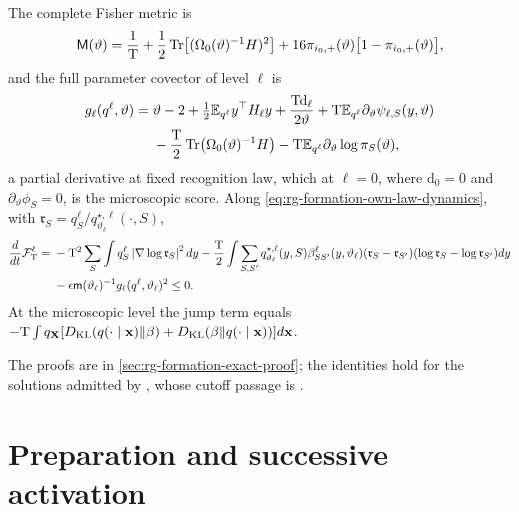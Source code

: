 The complete Fisher metric is
\begin{equation}
\mathsf M(\vartheta)
=\frac1{\mathrm T}+\frac12\operatorname{Tr}\bigl[(\Omega_0(\vartheta)^{-1}H)^2\bigr]
 +16\pi_{i_0,+}(\vartheta)\bigl[1-\pi_{i_0,+}(\vartheta)\bigr],
\label{eq:rg-formation-model-fisher}
\end{equation}
and the full parameter covector of level \(\ell\) is
\begin{equation}
\begin{aligned}
g_\ell(q^\ell,\vartheta)
={}&\vartheta-2+\tfrac12\mathbb E_{q^\ell}y^\top H_\ell y
       +\frac{\mathrm T \mathrm d_\ell}{2\vartheta}
       +\mathrm T\mathbb E_{q^\ell}\partial_\vartheta\psi_{\ell,S}(y,\vartheta)\\
 &-\frac{\mathrm T}2\operatorname{Tr}\bigl(\Omega_0(\vartheta)^{-1}H\bigr)
       -\mathrm T\mathbb E_{q^\ell}\partial_\vartheta\log\pi_S(\vartheta),
\end{aligned}
\label{eq:rg-formation-complete-score}
\end{equation}
a partial derivative at fixed recognition law, which at \(\ell=0\), where
\(\mathrm d_0=0\) and \(\partial_\vartheta\phi_S=0\), is the microscopic score.
Along \cref{eq:rg-formation-own-law-dynamics}, with
\(\mathfrak r_S=q^\ell_S/q^{\star,\ell}_{\vartheta_\ell}(\cdot,S)\),
\begin{equation}
\begin{aligned}
\frac{d}{dt}\mathcal F_{\mathrm T}^\ell
={}&-\mathrm T^2\sum_S\int q_S^\ell
       \left|\nabla\log\mathfrak r_S\right|^2dy
 -\frac{\mathrm T}2\int\sum_{S,S'}q^{\star,\ell}_{\vartheta_\ell}(y,S)\beta^\ell_{SS'}(y,\vartheta_\ell)
       (\mathfrak r_S-\mathfrak r_{S'})(\log\mathfrak r_S-\log\mathfrak r_{S'}) dy\\
 &-\epsilon \mathsf m(\vartheta_\ell)^{-1}g_\ell(q^\ell,\vartheta_\ell)^2
 \le0.
\end{aligned}
\label{eq:rg-formation-dissipation}
\end{equation}
At the microscopic level the jump term equals
\(-\mathrm T\int q_{\mathbf X}[D_{\mathrm{KL}}(q(\cdot\mid\mathbf x)\Vert\beta)
+D_{\mathrm{KL}}(\beta\Vert q(\cdot\mid\mathbf x))]d\mathbf x\). 

The proofs are in \cref{sec:rg-formation-exact-proof}; the identities hold for
the solutions admitted by , whose
cutoff passage is .

\section{Preparation and successive activation}
\label{sec:rg-formation-preparation}

